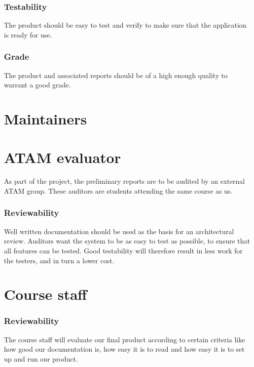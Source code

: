         \subsubsection*{Testability}
        The product should be easy to test and verify to make sure that the application is ready for use.

        \subsubsection*{Grade}
        The product and associated reports should be of a high enough quality to warrant a good grade.

    \section{Maintainers}
    
    
    \section{ATAM evaluator}
    As part of the project, the preliminary reports are to be audited by an external ATAM group. These auditors are students attending the same course as us.

        \subsubsection*{Reviewability}
        Well written documentation should be used as the basis for an architectural review. Auditors want the system to be as easy to test as possible, to ensure that all features can be tested. Good testability will therefore result in less work for the testers, and in turn a lower cost.


    \section{Course staff}
        \subsubsection*{Reviewability}
        The course staff will evaluate our final product according to certain criteria like how good our documentation is, how easy it is to read and how easy it is to set up and run our product.